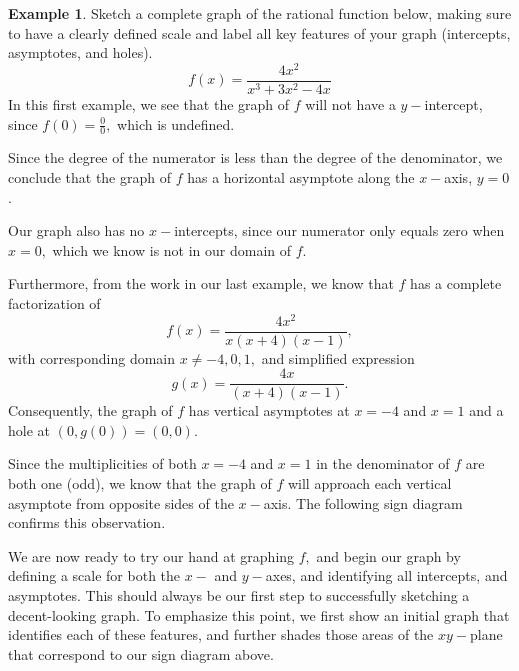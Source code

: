 \documentclass[12pt]{book}
\theoremstyle{definition}
\newtheorem{example}{Example}
\begin{document}
\begin{example}Sketch a complete graph of the rational function below, making sure to have a clearly defined scale and label all key features of your graph (intercepts, asymptotes, and holes).
$$f(x)=\dfrac{4x^2}{x^3+3x^2-4x}$$
In this first example, we see that the graph of $f$ will not have a $y-$intercept, since $f(0)=\frac{0}{0},$ which is undefined.
\par
Since the degree of the numerator is less than the degree of the denominator, we conclude that the graph of $f$ has a horizontal asymptote along the $x-$axis, $y=0$.
\par
Our graph also has no $x-$intercepts, since our numerator only equals zero when $x=0,$ which we know is not in our domain of $f$.
\par
Furthermore, from the work in our last example, we know that $f$ has a complete factorization of
$$f(x)=\dfrac{4x^2}{x(x+4)(x-1)},$$
with corresponding domain $x\neq -4,0,1,$ and simplified expression
$$g(x)=\dfrac{4x}{(x+4)(x-1)}.$$
Consequently, the graph of $f$ has vertical asymptotes at $x=-4$ and $x=1$ and a hole at $(0,g(0))=(0,0)$.
\par
Since the multiplicities of both $x=-4$ and $x=1$ in the denominator of $f$ are both one (odd), we know that the graph of $f$ will approach each vertical asymptote from opposite sides of the $x-$axis.  The following sign diagram confirms this observation.
\begin{center}
\end{center}
We are now ready to try our hand at graphing $f,$ and begin our graph by defining a scale for both the $x-$ and $y-$axes, and identifying all intercepts, and asymptotes.  This should always be our first step to successfully sketching a decent-looking graph.  To emphasize this point, we first show an initial graph that identifies each of these features, and further shades those areas of the $xy-$plane that correspond to our sign diagram above.

\end{example}
\end{document}
